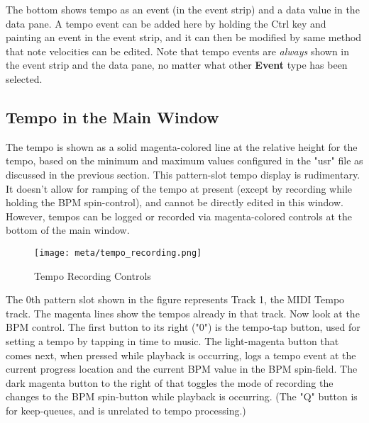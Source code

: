 The bottom shows tempo as an event (in the event strip) and a data value
in the data pane.  A tempo event can be added here by holding the Ctrl key
and painting an event in the event strip, and it can then be modified by
same method that note velocities can be edited.  Note that tempo events 
are \textsl{always} shown in the event strip and the data pane, no matter
what other \textbf{Event} type has been selected.

\subsection{Tempo in the Main Window}
\label{subsec:meta_events_mainwid}

%
%

The tempo is shown as a solid magenta-colored line at the relative height
for the tempo,
based on the minimum and maximum values configured in the "usr" file as
discussed in the previous section.
This pattern-slot tempo display is rudimentary.  It doesn't allow for ramping
of the tempo at present (except by recording while holding the BPM
spin-control), and cannot be directly edited in this window.
However, tempos can be logged or recorded via magenta-colored controls at the
bottom of the main window.

\begin{figure}[H]
   \centering 
   \texttt{[image: meta/tempo\_recording.png]}
   \caption{Tempo Recording Controls}
   \label{fig:meta_events_mainwid_tempo_recording}
\end{figure}

The 0th pattern slot shown in the figure represents Track 1, the
MIDI Tempo track.  The magenta lines show the tempos already in that track.
Now look at the BPM control.  The first button to its right ("0") is the
tempo-tap button, used for setting a tempo by tapping in time to music.
The light-magenta button that comes next, when pressed while playback is
occurring, logs a tempo event at the current progress location and the
current BPM value in the BPM spin-field.  The dark magenta button to the right
of that toggles the mode of recording the changes to the BPM spin-button while
playback is occurring.  (The "Q" button is for keep-queues, and is unrelated to
tempo processing.)

